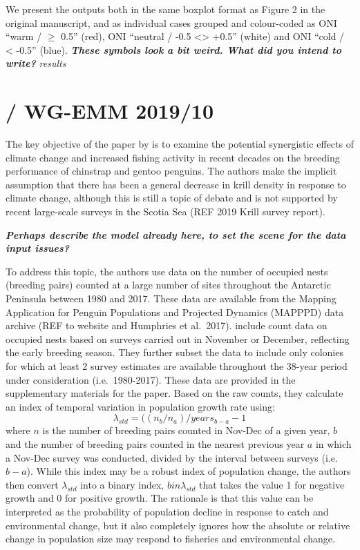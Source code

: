 \documentclass[]{elsarticle} %
\begin{document}
We present the outputs both in the same boxplot format as Figure 2 in
the original manuscript, and as individual cases grouped and
colour-coded as ONI ``warm / \(\geqslant\) 0.5'' (red), ONI ``neutral /
-0.5 \textless\textgreater{} +0.5'' (white) and ONI ``cold / \textless{}
-0.5'' (blue). \textbf{\emph{These symbols look a bit weird. What did
you intend to write?}} \newline   \newline   \emph{results}\\
\newline

\section{\texorpdfstring{\citet{Kruger2021} / WG-EMM
2019/10}{@Kruger2021 / WG-EMM 2019/10}}\label{kruger2021-wg-emm-201910}

The key objective of the paper by \citet{Kruger2021} is to examine the
potential synergistic effects of climate change and increased fishing
activity in recent decades on the breeding performance of chinstrap and
gentoo penguins. The authors make the implicit assumption that there has
been a general decrease in krill density in response to climate change,
although this is still a topic of debate and is not supported by recent
large-scale surveys in the Scotia Sea (REF 2019 Krill survey report).

\textbf{\emph{Perhaps describe the model already here, to set the scene
for the data input issues?}}

To address this topic, the authors use data on the number of occupied
nests (breeding pairs) counted at a large number of sites throughout the
Antarctic Peninsula between 1980 and 2017. These data are available from
the Mapping Application for Penguin Populations and Projected Dynamics
(MAPPPD) data archive (REF to website and Humphries et al.~2017).
\citet{Kruger2021} include count data on occupied nests based on surveys
carried out in November or December, reflecting the early breeding
season. They further subset the data to include only colonies for which
at least 2 survey estimates are available throughout the 38-year period
under consideration (i.e.~1980-2017). These data are provided in the
supplementary materials for the paper. Based on the raw counts, they
calculate an index of temporal variation in population growth rate
using: \[\lambda_{std}=((n_b/n_a)/years_{b-a}-1\] where \(n\) is the
number of breeding pairs counted in Nov-Dec of a given year, \(b\) and
the number of breeding pairs counted in the nearest previous year \(a\)
in which a Nov-Dec survey was conducted, divided by the interval between
surveys (i.e.~\(b-a\)). While this index may be a robust index of
population change, the authors then convert \(\lambda_{std}\) into a
binary index, \(bin\lambda_{std}\) that takes the value 1 for negative
growth and 0 for positive growth. The rationale is that this value can
be interpreted as the probability of population decline in response to
catch and environmental change, but it also completely ignores how the
absolute or relative change in population size may respond to fisheries
and environmental change.
\end{document}
